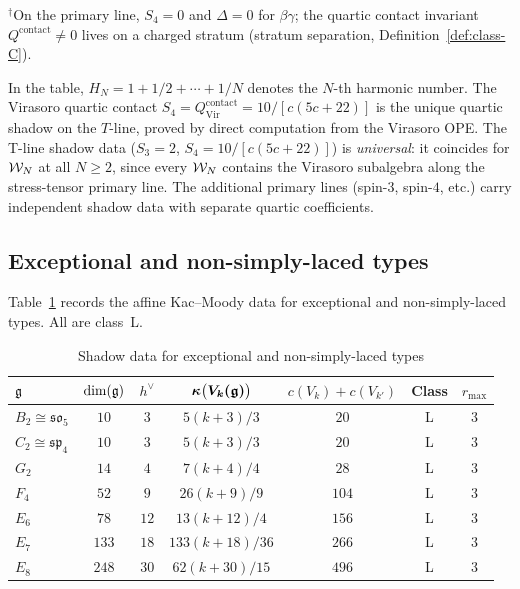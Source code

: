 \noindent
${}^\dagger$On the primary line, $S_4 = 0$ and $\Delta = 0$
for $\beta\gamma$; the quartic contact invariant
$Q^{\mathrm{contact}} \neq 0$ lives on a charged stratum
(stratum separation, Definition~\ref{def:class-C}).

\noindent
In the table, $H_N = 1 + 1/2 + \dotsb + 1/N$ denotes the
$N$-th harmonic number. The Virasoro quartic contact
$S_4 = Q^{\mathrm{contact}}_{\mathrm{Vir}} = 10/[c(5c+22)]$
is the unique quartic shadow on the $T$-line, proved by direct
computation from the Virasoro OPE. The T-line shadow data ($S_3 = 2$,
$S_4 = 10/[c(5c+22)]$) is \emph{universal}: it coincides for $\mathcal{W}_N$
at all $N \geq 2$, since every $\mathcal{W}_N$ contains the Virasoro
subalgebra along the stress-tensor primary line. The additional
primary lines (spin-$3$, spin-$4$, etc.) carry independent shadow
data with separate quartic coefficients.


\subsection{Exceptional and non-simply-laced types}\label{ssec:exceptional-table}

Table~\ref{tab:exceptional-shadow} records the affine Kac--Moody
data for exceptional and non-simply-laced types. All are class~L.

\begin{table}[ht]
\centering
\caption{Shadow data for exceptional and non-simply-laced types}
\label{tab:exceptional-shadow}
\renewcommand{\arraystretch}{1.35}
{\small
\begin{tabular}{lcccccc}
\toprule
$\mathfrak{g}$
 & $\dim(\mathfrak{g})$
 & $h^\vee$
 & $\boldsymbol{\kappa\bigl(V_k(\mathfrak{g})\bigr)}$
 & $c(V_k) + c(V_{k'})$
 & \textbf{Class}
 & $r_{\max}$ \\
\midrule
$B_2 \cong \mathfrak{so}_5$
 & $10$ & $3$ & $5(k{+}3)/3$ & $20$ & L & $3$ \\
$C_2 \cong \mathfrak{sp}_4$
 & $10$ & $3$ & $5(k{+}3)/3$ & $20$ & L & $3$ \\
$G_2$
 & $14$ & $4$ & $7(k{+}4)/4$ & $28$ & L & $3$ \\
$F_4$
 & $52$ & $9$ & $26(k{+}9)/9$ & $104$ & L & $3$ \\
$E_6$
 & $78$ & $12$ & $13(k{+}12)/4$ & $156$ & L & $3$ \\
$E_7$
 & $133$ & $18$ & $133(k{+}18)/36$ & $266$ & L & $3$ \\
$E_8$
 & $248$ & $30$ & $62(k{+}30)/15$ & $496$ & L & $3$ \\
\bottomrule
\end{tabular}
}
\end{table}

